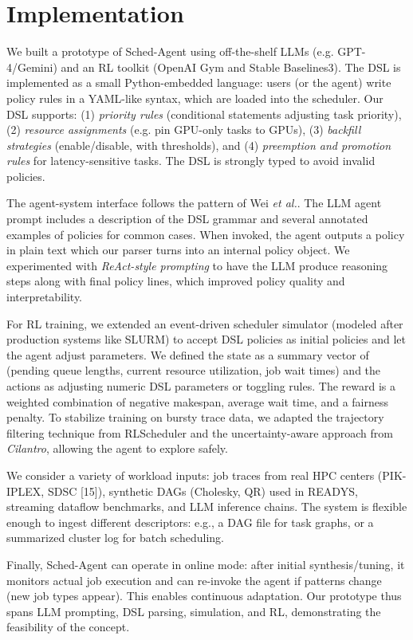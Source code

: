 \section{Implementation}

We built a prototype of Sched-Agent using off-the-shelf LLMs (e.g. GPT-4/Gemini) and an RL toolkit (OpenAI Gym and Stable Baselines3). The DSL is implemented as a small Python-embedded language: users (or the agent) write policy rules in a YAML-like syntax, which are loaded into the scheduler. Our DSL supports: (1) \emph{priority rules} (conditional statements adjusting task priority), (2) \emph{resource assignments} (e.g. pin GPU-only tasks to GPUs), (3) \emph{backfill strategies} (enable/disable, with thresholds), and (4) \emph{preemption and promotion rules} for latency-sensitive tasks. The DSL is strongly typed to avoid invalid policies.

The agent-system interface follows the pattern of Wei \emph{et al.}. The LLM agent prompt includes a description of the DSL grammar and several annotated examples of policies for common cases. When invoked, the agent outputs a policy in plain text which our parser turns into an internal policy object. We experimented with \emph{ReAct-style prompting} to have the LLM produce reasoning steps along with final policy lines, which improved policy quality and interpretability.

For RL training, we extended an event-driven scheduler simulator (modeled after production systems like SLURM) to accept DSL policies as initial policies and let the agent adjust parameters. We defined the state as a summary vector of (pending queue lengths, current resource utilization, job wait times) and the actions as adjusting numeric DSL parameters or toggling rules. The reward is a weighted combination of negative makespan, average wait time, and a fairness penalty. To stabilize training on bursty trace data, we adapted the trajectory filtering technique from RLScheduler and the uncertainty-aware approach from \emph{Cilantro}, allowing the agent to explore safely.

We consider a variety of workload inputs: job traces from real HPC centers (PIK-IPLEX, SDSC [15]), synthetic DAGs (Cholesky, QR) used in READYS, streaming dataflow benchmarks, and LLM inference chains. The system is flexible enough to ingest different descriptors: e.g., a DAG file for task graphs, or a summarized cluster log for batch scheduling.

Finally, Sched-Agent can operate in online mode: after initial synthesis/tuning, it monitors actual job execution and can re-invoke the agent if patterns change (new job types appear). This enables continuous adaptation. Our prototype thus spans LLM prompting, DSL parsing, simulation, and RL, demonstrating the feasibility of the concept.